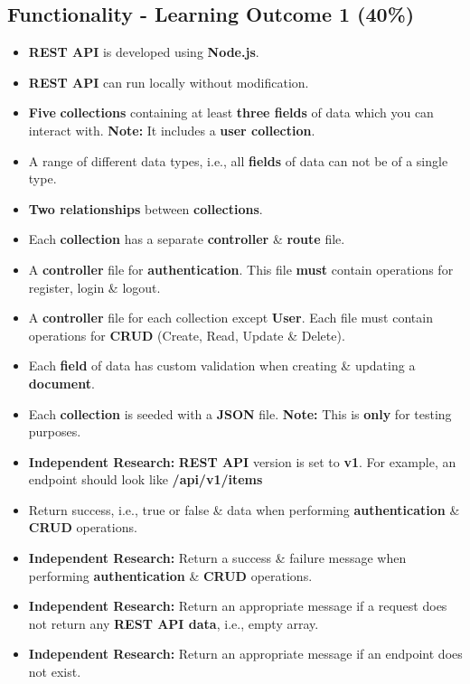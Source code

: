 \documentclass{article}
\begin{document}
\subsection*{Functionality - Learning Outcome 1 (40\%)}
\begin{itemize}
	\item \textbf{REST API} is developed using \textbf{Node.js}.
	\item \textbf{REST API} can run locally without modification.
	\item \textbf{Five} \textbf{collections} containing at least \textbf{three fields} of data which you can interact with. \textbf{Note:} It includes a \textbf{user collection}.
	\item A range of different data types, i.e., all \textbf{fields} of data can not be of a single type.
	\item \textbf{Two relationships} between \textbf{collections}.
	\item Each \textbf{collection} has a separate \textbf{controller} \& \textbf{route} file.
	\item A \textbf{controller} file for \textbf{authentication}. This file \textbf{must} contain operations for register, login \& logout.
	\item A \textbf{controller} file for each collection except \textbf{User}. Each file must contain operations for \textbf{CRUD} (Create, Read, Update \& Delete).
	\item Each \textbf{field} of data has custom validation when creating \& updating a \textbf{document}.
	\item Each \textbf{collection} is seeded with a \textbf{JSON} file. \textbf{Note:} This is \textbf{only} for testing purposes.
	\item \textbf{Independent Research:} \textbf{REST API} version is set to \textbf{v1}. For example, an endpoint should look like \textbf{/api/v1/items}
	\item Return success, i.e., true or false \& data when performing \textbf{authentication} \& \textbf{CRUD} operations.
	\item \textbf{Independent Research:} Return a success \& failure message when performing \textbf{authentication} \& \textbf{CRUD} operations.
	\item \textbf{Independent Research:} Return an appropriate message if a request does not return any \textbf{REST API data}, i.e., empty array.
	\item \textbf{Independent Research:} Return an appropriate message if an endpoint does not exist.

\end{itemize}
\end{document}
